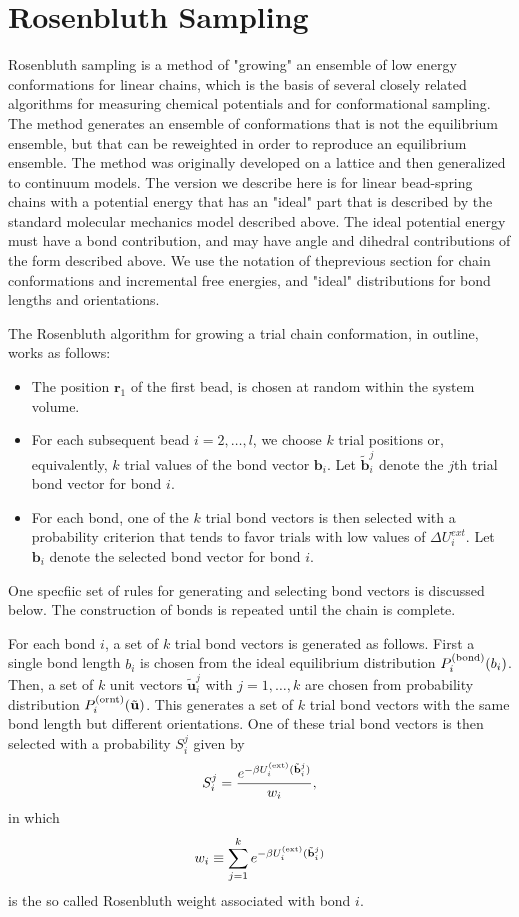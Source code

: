 \documentclass[12pt]{article} %
\newcommand{\vv}[1]{\mathbf{#1}}
\newcommand\delU{\Delta U}
\newcommand\Uext{U^{({\rm ext})}}
\newcommand\qbead{\vv{r}_{1}}
\newcommand\nbead{l}
\newcommand\vbond{\vv{b}}
\newcommand\rbond{b}
\newcommand\ntrial{k}
\newcommand\vtrial{\tilde{\vv{b}}}
\newcommand\utrial{\tilde{\vv{u}}}
\newcommand\Pbond{P^{({\rm bond})}}
\newcommand\Pornt{P^{({\rm ornt})}}
\begin{document}
\section{Rosenbluth Sampling} %
Rosenbluth sampling is a method of "growing" an ensemble of low energy conformations for linear chains, which is the basis of several closely related algorithms for measuring chemical potentials and for conformational sampling. The method generates an ensemble of conformations that is not the equilibrium ensemble, but that can be reweighted in order to reproduce an equilibrium ensemble. The method was originally developed on a lattice and then generalized to continuum models. The version we describe here is for linear bead-spring chains with a potential energy that has an "ideal" part that is described by the standard molecular mechanics model described above. The ideal potential energy must have a bond contribution, and may have angle and dihedral contributions of the form described above. We use the notation of theprevious section for chain conformations and incremental free energies, and "ideal" distributions for bond lengths and orientations.

The Rosenbluth algorithm for growing a trial chain conformation, in outline, works as 
follows:
\begin{itemize}
\item The position $\qbead$ of the first bead, is chosen at random within the system 
      volume.
\item For each subsequent bead $i=2,\ldots, \nbead$, we choose $\ntrial$ trial 
positions or, equivalently, $\ntrial$ trial values of the bond vector $\vbond_{i}$. 
Let $\vtrial_{i}^{j}$ denote the $j$th trial bond vector for bond $i$.
\item For each bond, one of the $\ntrial$ trial bond vectors is then selected with a 
probability criterion that tends to favor trials with low values of $\delU^{ext}_{i}$.
Let $\vbond_{i}$ denote the selected bond vector for bond $i$. 
\end{itemize} 
One specfiic set of rules for generating and selecting bond vectors is discussed below. 
The construction of bonds is repeated until the chain is complete.

For each bond $i$, a set of $\ntrial$ trial bond vectors is generated as follows.
First a single bond length $\rbond_{i}$ is chosen from the ideal equilibrium 
distribution $\Pbond_{i}(\rbond_{i})$. Then, a set of $\ntrial$ unit vectors 
$\utrial_{i}^{j}$ with $j=1,\ldots,\ntrial$ are chosen from probability distribution 
$\Pornt_{i}(\utrial)$.  This generates a set of $\ntrial$ trial bond vectors with 
the same bond length but different orientations.  One of these trial bond vectors 
is then selected with a probability $S^{j}_{i}$ given by
\begin{equation}
    S^{j}_{i} = \frac{e^{-\beta\Uext_{i}(\vtrial^{j}_{i})}}{w_{i}}
    \label{PtrialSelection},
\end{equation}
in which 
\begin{equation}
     w_{i} \equiv \sum_{j=1}^{\ntrial} e^{ -\beta \Uext_{i}(\vtrial^{j}_{i})}
     \label{RosenbluthBond}
\end{equation}
is the so called Rosenbluth weight associated with bond $i$.
\end{document}
